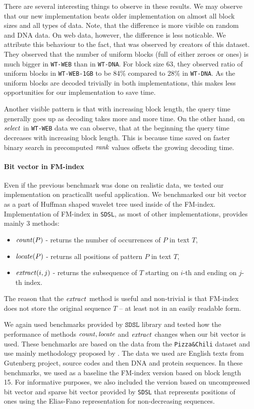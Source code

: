 There are several interesting things to observe in these results. We may observe that our new implementation
beats older implementation on almost all block sizes and all types of data. Note, that the difference is more
visible on random and DNA data. On web data, however, the difference is less noticable. We attribute
this behaviour to the fact, that was observed by creators of this dataset. They observed that the number of
uniform blocks (full of either zeroes or ones) is much bigger in \texttt{WT-WEB} than in \texttt{WT-DNA}.
For block size 63, they observed ratio of uniform blocks in \texttt{WT-WEB-1GB} to be 84\% compared to 28\% in
\texttt{WT-DNA}. As the uniform blocks are decoded trivially in both implementations, this makes less opportunities
for our implementation to save time.

Another visible pattern is that with increasing block length, the query time generally goes up as decoding takes
more and more time. On the other hand, on $\mathit{select}$ in \texttt{WT-WEB} data we can observe, that at the beginning
the query time decreases with increasing block length. This is because time saved on faster binary search in
precomputed $\mathit{rank}$ values offsets the growing decoding time.

\paragraph{Bit vector in FM-index}

Even if the previous benchmark was done on realistic data, we tested our implementation on
practicallt useful application. We benchmarked our bit vector as a part of Huffman shaped
wavelet tree used inside of the FM-index. Implementation of FM-index in \texttt{SDSL}, as most
of other implementations, provides mainly 3 methods:
\begin{itemize}
	\item $\mathit{count}(P)$ - returns the number of occurrences of $P$ in text $T$,
	\item $\mathit{locate}(P)$ - returns all positions of pattern $P$ in text $T$,
	\item $\mathit{extract}(i, j)$ - returns the subsequence of $T$ starting on $i$-th and ending on $j$-th index.
\end{itemize}
The reason that the $\mathit{extract}$ method is useful and non-trivial is that FM-index
does not store the original sequence $T$ -- at least not in an easily readable form.

We again used benchmarks provided by $\texttt{SDSL}$ library and tested how the performance
of methods $\mathit{count}, \mathit{locate}$ and $\mathit{extract}$ changes when our bit vector is used. These
benchmarks are based on the data from the \texttt{Pizza\&Chili} dataset and use mainly methodology
proposed by \cite{ferragina2009compressed}. The data we used are English texts from Gutenberg
project, source codes and then DNA and protein sequences. In these benchmarks, we used as a
baseline the FM-index version based on block length 15. For informative purposes, we also included
the version based on uncompressed bit vector and sparse bit vector provided by \texttt{SDSL} that
represents positions of ones using the Elias-Fano representation for non-decreasing sequences.

